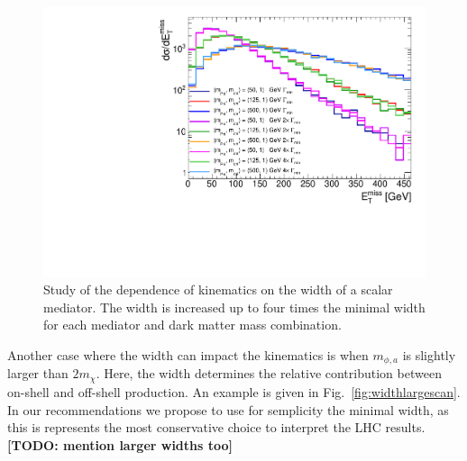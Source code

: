 \begin{figure}[!ht]
  \begin{center}
    \includegraphics[scale=0.45]{figures/ttbar/MEt_smallwidth.pdf}
    \vspace{2mm}
    \caption{\label{fig:widthsmallscan} Study of the dependence of kinematics on the width of a scalar mediator. The width is increased up to four times the minimal width for each mediator and dark matter mass combination. 
    }
\end{center}
\end{figure}

Another case where the width can impact the kinematics is when $m_{\phi,a}$ is slightly larger than $2m_\chi$. Here, the width determines the relative contribution between on-shell and off-shell production. An example is given in Fig.~\ref{fig:widthlargescan}. In our recommendations we propose to use for semplicity the minimal width, as this is represents the most conservative choice to interpret the LHC results. \textbf{[TODO: mention larger widths too]}


